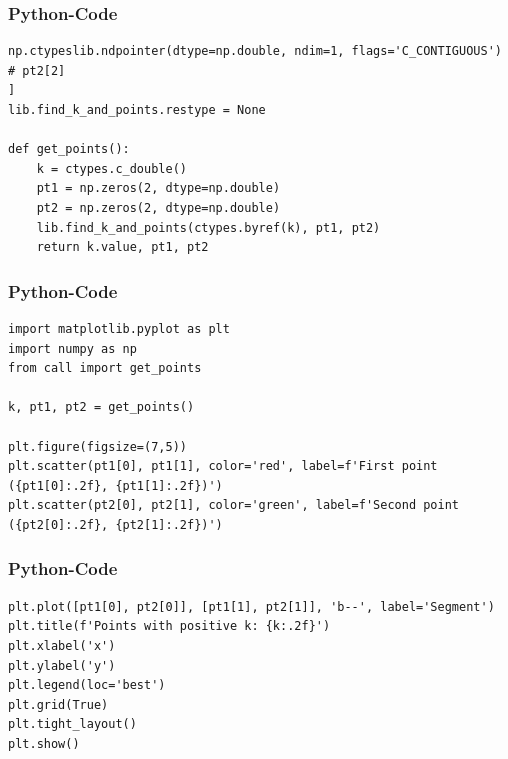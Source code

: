 \documentclass{beamer}
\begin{document}
\begin{frame}[fragile]
\frametitle{Python-Code}
\begin{lstlisting}
np.ctypeslib.ndpointer(dtype=np.double, ndim=1, flags='C_CONTIGUOUS')  # pt2[2]
]
lib.find_k_and_points.restype = None

def get_points():
    k = ctypes.c_double()
    pt1 = np.zeros(2, dtype=np.double)
    pt2 = np.zeros(2, dtype=np.double)
    lib.find_k_and_points(ctypes.byref(k), pt1, pt2)
    return k.value, pt1, pt2

\end{lstlisting}
\end{frame}

\begin{frame}[fragile]
\frametitle{Python-Code}
\begin{lstlisting}
import matplotlib.pyplot as plt
import numpy as np
from call import get_points

k, pt1, pt2 = get_points()

plt.figure(figsize=(7,5))
plt.scatter(pt1[0], pt1[1], color='red', label=f'First point ({pt1[0]:.2f}, {pt1[1]:.2f})')
plt.scatter(pt2[0], pt2[1], color='green', label=f'Second point ({pt2[0]:.2f}, {pt2[1]:.2f})')

\end{lstlisting}
\end{frame}

\begin{frame}[fragile]
\frametitle{Python-Code}
\begin{lstlisting}
plt.plot([pt1[0], pt2[0]], [pt1[1], pt2[1]], 'b--', label='Segment')
plt.title(f'Points with positive k: {k:.2f}')
plt.xlabel('x')
plt.ylabel('y')
plt.legend(loc='best')
plt.grid(True)
plt.tight_layout()
plt.show()


\end{lstlisting}
\end{frame}
\end{document}
